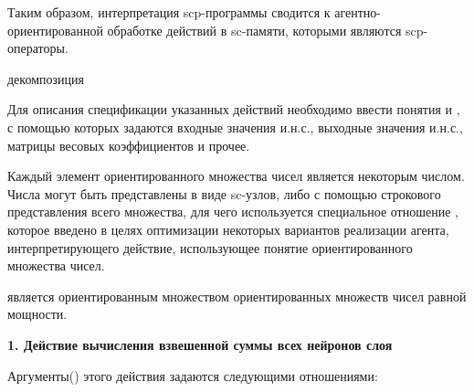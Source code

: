 Таким образом, интерпретация scp-программы сводится к агентно-ориентированной обработке действий в sc-памяти, которыми являются scp-операторы.

\begin{SCn}
	\begin{scnrelfromset}{декомпозиция}
	\end{scnrelfromset}
\end{SCn}

Для описания спецификации указанных действий необходимо ввести понятия  и , с помощью которых задаются входные значения и.н.с., выходные значения и.н.с., матрицы весовых коэффициентов и прочее.

Каждый элемент ориентированного множества чисел является некоторым числом. Числа могут быть представлены в виде sc-узлов, либо с помощью строкового представления всего множества, для чего используется специальное отношение , которое введено в целях оптимизации некоторых вариантов реализации агента, интерпретирующего действие, использующее понятие ориентированного множества чисел.

\begin{SCn}
\end{SCn}

 является ориентированным множеством ориентированных множеств чисел равной мощности.


\textbf{1. Действие вычисления взвешенной суммы всех нейронов слоя}

Аргументы() этого действия задаются следующими отношениями:
\begin{SCn}
\end{SCn}

\begin{SCn}
\end{SCn}

